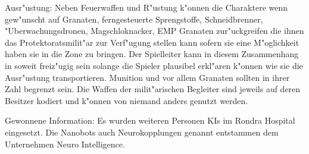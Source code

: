 \begin{remarks}
	Ausr"ustung: Neben Feuerwaffen und R"ustung k"onnen die Charaktere wenn gew"unscht auf Granaten, ferngesteuerte Sprengstoffe, Schneidbrenner, "Uberwachungsdronen, Magschlo\3knacker, EMP Granaten zur"uckgreifen die ihnen das Protektoratsmilit"ar zur Verf"ugung stellen kann sofern sie eine M"oglichkeit haben sie in die Zone zu bringen. Der Spielleiter kann in diesem Zusammenhang in soweit freiz"ugig sein solange die Spieler plausibel erkl"aren k"onnen wie sie die Ausr"ustung transportieren. Munition und vor allem Granaten sollten in ihrer Zahl begrenzt sein. Die Waffen der milit"arischen Begleiter sind jeweils auf deren Besitzer kodiert und k"onnen von
	niemand anders genutzt werden.

	Gewonnene Information:  Es wurden weiteren Personen KIs im Rondra Hospital eingesetzt. Die Nanobots auch Neurokopplungen genannt entstammen dem Unternehmen Neuro Intelligence. 
\end{remarks}
